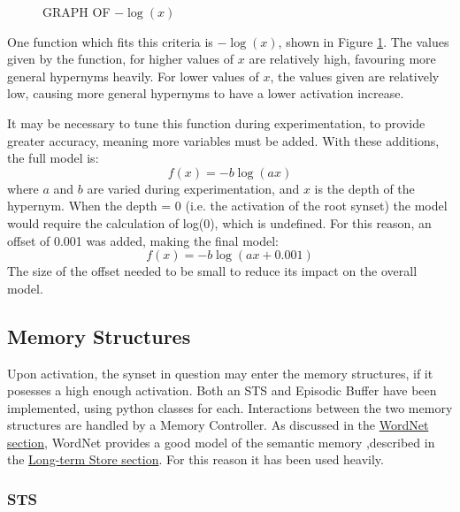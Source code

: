 \documentclass[]{article}
\begin{document}
\begin{figure}[h]
\caption{GRAPH OF $-\log(x)$}
\label{fig:logGraph}
\end{figure}

One function which fits this criteria is $-\log(x)$, shown in Figure \ref{fig:logGraph}. The values given by the function, for higher values of $x$ are relatively high, favouring more general hypernyms heavily. For lower values of $x$, the values given are relatively low, causing more general hypernyms to have a lower activation increase.

It may be necessary to tune this function during experimentation, to provide greater accuracy, meaning more variables must be added. With these additions, the full model is:
\[f(x) = -b\log(ax)\]
where $a$ and $b$ are varied during experimentation, and $x$ is the depth of the hypernym. When the depth = 0 (i.e. the activation of the root synset) the model would require the calculation of log(0), which is undefined. For this reason, an offset of 0.001 was added, making the final model:
\[f(x) = -b\log(ax+0.001)\]
The size of the offset needed to be small to reduce its impact on the overall model.


\subsection{Memory Structures}
\label{sec:ImplementedMemoryStructures}

Upon activation, the synset in question may enter the memory structures, if it posesses a high enough activation. Both an STS and Episodic Buffer have been implemented, using python classes for each. Interactions between the two memory structures are handled by a Memory Controller. As discussed in the \hyperref[Wordnet]{WordNet section}, WordNet provides a good model of the semantic memory \cite{WN1Introduction},described in the \hyperref[LongTerm]{Long-term Store section}. For this reason it has been used heavily.

\subsubsection{STS}
\label{sec:ImplementedSTS}
\end{document}
